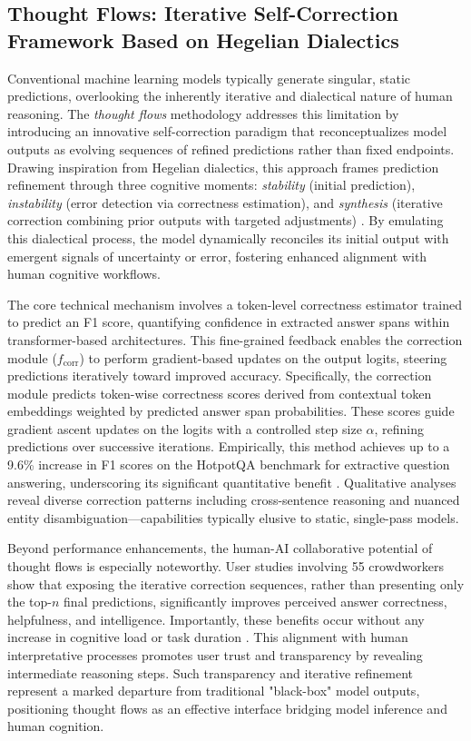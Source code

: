 \documentclass[sigconf]{acmart}
\begin{document}
\subsection{Thought Flows: Iterative Self-Correction Framework Based on Hegelian Dialectics}

Conventional machine learning models typically generate singular, static predictions, overlooking the inherently iterative and dialectical nature of human reasoning. The \emph{thought flows} methodology addresses this limitation by introducing an innovative self-correction paradigm that reconceptualizes model outputs as evolving sequences of refined predictions rather than fixed endpoints. Drawing inspiration from Hegelian dialectics, this approach frames prediction refinement through three cognitive moments: \textit{stability} (initial prediction), \textit{instability} (error detection via correctness estimation), and \textit{synthesis} (iterative correction combining prior outputs with targeted adjustments) \cite{ref43}. By emulating this dialectical process, the model dynamically reconciles its initial output with emergent signals of uncertainty or error, fostering enhanced alignment with human cognitive workflows.

The core technical mechanism involves a token-level correctness estimator trained to predict an F1 score, quantifying confidence in extracted answer spans within transformer-based architectures. This fine-grained feedback enables the correction module ($f_{\text{corr}}$) to perform gradient-based updates on the output logits, steering predictions iteratively toward improved accuracy. Specifically, the correction module predicts token-wise correctness scores derived from contextual token embeddings weighted by predicted answer span probabilities. These scores guide gradient ascent updates on the logits with a controlled step size $\alpha$, refining predictions over successive iterations. Empirically, this method achieves up to a 9.6\% increase in F1 scores on the HotpotQA benchmark for extractive question answering, underscoring its significant quantitative benefit \cite{ref43}. Qualitative analyses reveal diverse correction patterns including cross-sentence reasoning and nuanced entity disambiguation—capabilities typically elusive to static, single-pass models.

Beyond performance enhancements, the human-AI collaborative potential of thought flows is especially noteworthy. User studies involving 55 crowdworkers show that exposing the iterative correction sequences, rather than presenting only the top-$n$ final predictions, significantly improves perceived answer correctness, helpfulness, and intelligence. Importantly, these benefits occur without any increase in cognitive load or task duration \cite{ref43}. This alignment with human interpretative processes promotes user trust and transparency by revealing intermediate reasoning steps. Such transparency and iterative refinement represent a marked departure from traditional "black-box" model outputs, positioning thought flows as an effective interface bridging model inference and human cognition.
\end{document}
